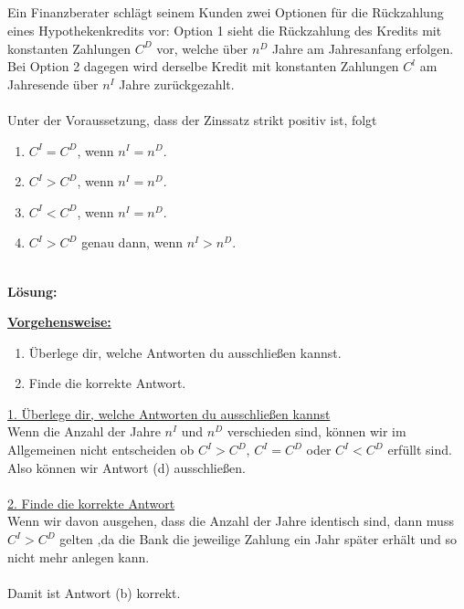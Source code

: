 \subsection*{}
Ein Finanzberater schlägt seinem Kunden zwei Optionen für die Rückzahlung eines Hypothekenkredits vor:
Option 1 sieht die Rückzahlung des Kredits mit konstanten Zahlungen $ C^D  $ vor, welche über $ n^D $ Jahre am Jahresanfang erfolgen. Bei Option 2 dagegen wird derselbe Kredit mit konstanten Zahlungen $ C^l $ am Jahresende über $ n^I $ Jahre zurückgezahlt.\\
\\
Unter der Voraussetzung, dass der Zinssatz strikt positiv ist, folgt
\renewcommand{\labelenumi}{(\alph{enumi})}
\begin{enumerate}
	\item 
	$ C^I = C^D$, wenn $ n^I = n^D $.
	\item
	$ C^I > C^D$, wenn $ n^I = n^D $.
	\item
	$ C^I < C^D$, wenn $ n^I = n^D $.
	\item
	$ C^I > C^D $ genau dann, wenn $ n^I > n^D $.
\end{enumerate}
\ \\
\textbf{Lösung:}
\begin{mdframed}
\underline{\textbf{Vorgehensweise:}}
\renewcommand{\labelenumi}{\theenumi.}
\begin{enumerate}
\item Überlege dir, welche Antworten du ausschließen kannst.
\item Finde die korrekte Antwort.
\end{enumerate}
\end{mdframed}

\underline{1. Überlege dir, welche Antworten du ausschließen kannst}\\
Wenn die Anzahl der Jahre $ n^I $ und $ n^D $ verschieden sind, können wir im Allgemeinen nicht entscheiden ob 
$ C^I > C^D $, $ C^I = C^D $ oder $ C^I < C^D $ erfüllt sind.
Also können wir Antwort (d) ausschließen.\\
\\
\underline{2. Finde die korrekte Antwort}\\
Wenn wir davon ausgehen, dass die Anzahl der Jahre identisch sind, dann muss $ C^I > C^D $ gelten ,da die Bank die  jeweilige Zahlung ein Jahr später erhält und so nicht mehr anlegen kann.
\\
\\
Damit ist Antwort (b) korrekt.

